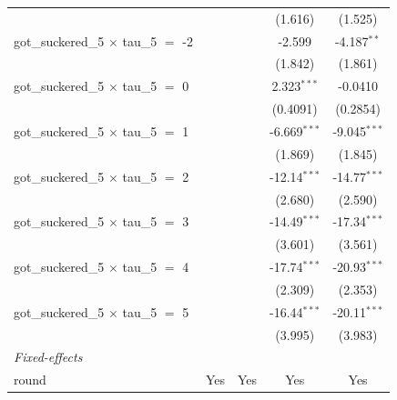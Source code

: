 \begin{tabular}{lcccc}
                                                 &                &                 & (1.616)        & (1.525)\\   
   got\_suckered\_5 $\times$ tau\_5 $=$ -2       &                &                 & -2.599         & -4.187$^{**}$\\   
                                                 &                &                 & (1.842)        & (1.861)\\   
   got\_suckered\_5 $\times$ tau\_5 $=$ 0        &                &                 & 2.323$^{***}$  & -0.0410\\   
                                                 &                &                 & (0.4091)       & (0.2854)\\   
   got\_suckered\_5 $\times$ tau\_5 $=$ 1        &                &                 & -6.669$^{***}$ & -9.045$^{***}$\\   
                                                 &                &                 & (1.869)        & (1.845)\\   
   got\_suckered\_5 $\times$ tau\_5 $=$ 2        &                &                 & -12.14$^{***}$ & -14.77$^{***}$\\   
                                                 &                &                 & (2.680)        & (2.590)\\   
   got\_suckered\_5 $\times$ tau\_5 $=$ 3        &                &                 & -14.49$^{***}$ & -17.34$^{***}$\\   
                                                 &                &                 & (3.601)        & (3.561)\\   
   got\_suckered\_5 $\times$ tau\_5 $=$ 4        &                &                 & -17.74$^{***}$ & -20.93$^{***}$\\   
                                                 &                &                 & (2.309)        & (2.353)\\   
   got\_suckered\_5 $\times$ tau\_5 $=$ 5        &                &                 & -16.44$^{***}$ & -20.11$^{***}$\\   
                                                 &                &                 & (3.995)        & (3.983)\\   
   \midrule
   \emph{Fixed-effects}\\
   round                                         & Yes            & Yes             & Yes            & Yes\\  

\end{tabular}
